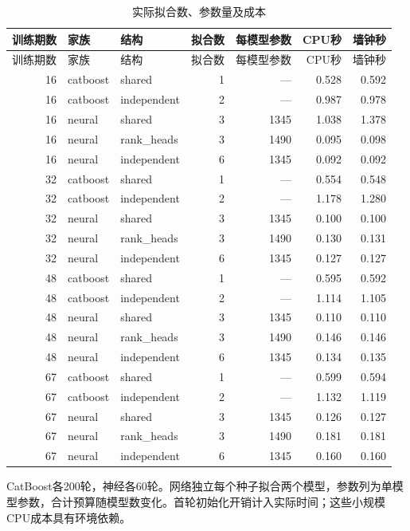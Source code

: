 \begingroup\footnotesize\setlength{\tabcolsep}{3pt}
\begin{longtable}{r l l r r r r}
\caption{实际拟合数、参数量及成本}\label{tab:fitbudget}\\
\toprule
训练期数 & 家族 & 结构 & 拟合数 & 每模型参数 & CPU秒 & 墙钟秒 \\
\midrule\endfirsthead
\toprule
训练期数 & 家族 & 结构 & 拟合数 & 每模型参数 & CPU秒 & 墙钟秒 \\
\midrule\endhead
16 & catboost & shared & 1 & — & 0.528 & 0.592 \\
16 & catboost & independent & 2 & — & 0.987 & 0.978 \\
16 & neural & shared & 3 & 1345 & 1.038 & 1.378 \\
16 & neural & rank\_heads & 3 & 1490 & 0.095 & 0.098 \\
16 & neural & independent & 6 & 1345 & 0.092 & 0.092 \\
32 & catboost & shared & 1 & — & 0.554 & 0.548 \\
32 & catboost & independent & 2 & — & 1.178 & 1.280 \\
32 & neural & shared & 3 & 1345 & 0.100 & 0.100 \\
32 & neural & rank\_heads & 3 & 1490 & 0.130 & 0.131 \\
32 & neural & independent & 6 & 1345 & 0.127 & 0.127 \\
48 & catboost & shared & 1 & — & 0.595 & 0.592 \\
48 & catboost & independent & 2 & — & 1.114 & 1.105 \\
48 & neural & shared & 3 & 1345 & 0.110 & 0.110 \\
48 & neural & rank\_heads & 3 & 1490 & 0.146 & 0.146 \\
48 & neural & independent & 6 & 1345 & 0.134 & 0.135 \\
67 & catboost & shared & 1 & — & 0.599 & 0.594 \\
67 & catboost & independent & 2 & — & 1.132 & 1.119 \\
67 & neural & shared & 3 & 1345 & 0.126 & 0.127 \\
67 & neural & rank\_heads & 3 & 1490 & 0.181 & 0.181 \\
67 & neural & independent & 6 & 1345 & 0.160 & 0.160 \\
\bottomrule
\end{longtable}
\noindent CatBoost各200轮，神经各60轮。网络独立每个种子拟合两个模型，参数列为单模型参数，合计预算随模型数变化。首轮初始化开销计入实际时间；这些小规模CPU成本具有环境依赖。\par
\endgroup
